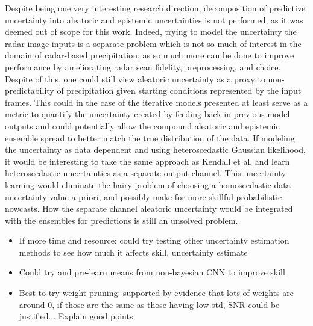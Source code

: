 Despite being one very interesting research direction, decomposition of predictive uncertainty into aleatoric and epistemic uncertainties is not performed, as it was deemed out of scope for this work. Indeed, trying to model the uncertainty the radar image inputs is a separate problem which is not so much of interest in the domain of radar-based precipitation, as so much more can be done to improve performance by ameliorating radar scan fidelity, preprocessing, and choice. Despite of this, one could still view aleatoric uncertainty as a proxy to non-predictability of precipitation given starting conditions represented by the input frames. This could in the case of the iterative models presented at least serve as a metric to quantify the uncertainty created by feeding back in previous model outputs and could potentially allow the compound aleatoric and epistemic ensemble spread to better match the true distribution of the data. If modeling the uncertainty as data dependent and using heteroscedastic Gaussian likelihood, it would be interesting to take the same approach as Kendall et al. \cite{kendall_what_2017} and learn heteroscedastic uncertainties as a separate output channel. This uncertainty learning would eliminate the hairy problem of choosing a homoscedastic data uncertainty value a priori, and possibly make for more skillful probabilistic nowcasts. How the separate channel aleatoric uncertainty would be integrated with the ensembles for predictions is still an unsolved problem. 

\begin{itemize}
		\item If more time and resource: could try testing other uncertainty estimation methods to see how much it affects skill, uncertainty estimate
		\item Could try and pre-learn means from non-bayesian CNN to improve skill
		\item Best to try weight pruning: supported by evidence that lots of weights are around 0, if those are the same as those having low std, SNR could be justified... Explain good points
\end{itemize}

